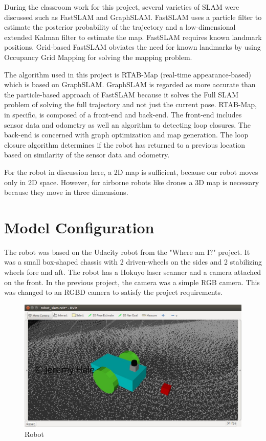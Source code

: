 \documentclass[10pt,journal,compsoc]{IEEEtran}
\begin{document}
During the classroom work for this project, several varieties of SLAM were discussed such as FastSLAM and GraphSLAM. FastSLAM uses a particle filter to estimate the posterior probability of the trajectory and a low-dimensional extended Kalman filter to estimate the map. FastSLAM requires known landmark positions. Grid-based FastSLAM obviates the need for known landmarks by using Occupancy Grid Mapping for solving the mapping problem.

The algorithm used in this project is RTAB-Map (real-time appearance-based) which is based on GraphSLAM. GraphSLAM is regarded as more accurate than the particle-based approach of FastSLAM because it solves the Full SLAM problem of solving the full trajectory and not just the current pose. RTAB-Map, in specific, is composed of a front-end and back-end. The front-end includes sensor data and odometry as well an algorithm to detecting loop closures. The back-end is concerned with graph optimization and map generation. The loop closure algorithm determines if the robot has returned to a previous location based on similarity of the sensor data and odometry.

For the robot in discussion here, a 2D map is sufficient, because our robot moves only in 2D space. However, for airborne robots like drones a 3D map is necessary because they move in three dimensions.


\section{Model Configuration}
The robot was based on the Udacity robot from the "Where am I?" project. It was a small box-shaped chassis with 2 driven-wheels on the sides and 2 stabilizing wheels fore and aft. The robot has a Hokuyo laser scanner and a camera attached on the front. In the previous project, the camera was a simple RGB camera. This was changed to an RGBD camera to satisfy the project requirements.

\begin{figure}[thpb]
    \centering
    \includegraphics[width=\linewidth]{robot}
    \caption{Robot}
    \label{fig:robot}
\end{figure}
\end{document}
